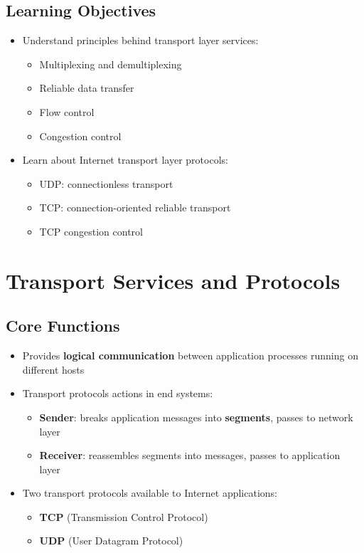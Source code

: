 \documentclass[12pt]{article}
\begin{document}
\subsection{Learning Objectives}
\begin{itemize}
    \item Understand principles behind transport layer services:
          \begin{itemize}
              \item Multiplexing and demultiplexing
              \item Reliable data transfer
              \item Flow control
              \item Congestion control
          \end{itemize}
    \item Learn about Internet transport layer protocols:
          \begin{itemize}
              \item UDP: connectionless transport
              \item TCP: connection-oriented reliable transport
              \item TCP congestion control
          \end{itemize}
\end{itemize}

\section{Transport Services and Protocols}

\subsection{Core Functions}
\begin{itemize}
    \item Provides \textbf{logical communication} between application processes running on different hosts
    \item Transport protocols actions in end systems:
          \begin{itemize}
              \item \textbf{Sender}: breaks application messages into \textbf{segments}, passes to network layer
              \item \textbf{Receiver}: reassembles segments into messages, passes to application layer
          \end{itemize}
    \item Two transport protocols available to Internet applications:
          \begin{itemize}
              \item \textbf{TCP} (Transmission Control Protocol)
              \item \textbf{UDP} (User Datagram Protocol)
          \end{itemize}
\end{itemize}
\end{document}
